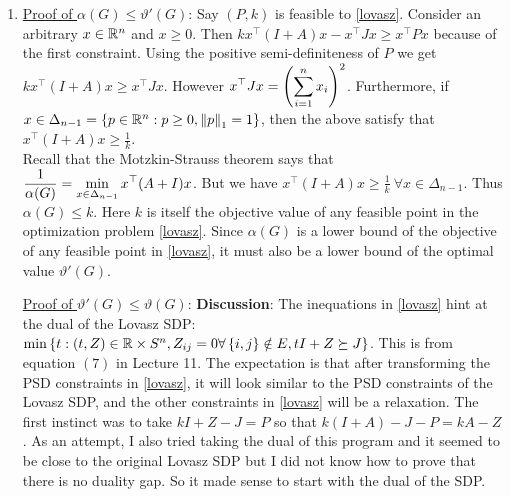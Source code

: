 \soln

\begin{enumerate}[leftmargin=*, label=(\alph*)]
\item \underline{Proof of $\alpha(G)\le \vartheta'(G)$}: Say $(P,k)$ is feasible to \ref{lovasz}. Consider an arbitrary $x\in \mathbb{R}^{n}$ and $x\ge 0$. Then $k x^{\top}(I+A)x - x^{\top}Jx \ge x^{\top} Px$ because of the first constraint. Using the positive semi-definiteness of $P$ we get $k x^{\top}(I+A)x \ge x^{\top}Jx$. However $\displaystyle x^{\top}Jx = \left(\sum_{i=1}^{n}x_{i}\right)^{2}$. Furthermore, if $x\in \Delta_{n-1} = \left\{p\in \mathbb{R}^{n} : p\ge 0, \left\lVert p \right\rVert_{1} = 1\right\}$, then the above satisfy that $x^{\top}(I+A)x \ge \frac{1}{k}$. \\
Recall that the Motzkin-Strauss theorem says that $\displaystyle\frac{1}{\alpha(G)}=\min_{x\in \Delta_{n-1}} x^{\top}(A+I)x$. But we have $x^{\top}(I+A)x \ge \frac{1}{k}~\forall x\in \Delta_{n-1}$. Thus $\alpha(G)\le k$. Here $k$ is itself the objective value of any feasible point in the optimization problem \ref{lovasz}. Since $\alpha(G)$ is a lower bound of the objective of any feasible point in \ref{lovasz}, it must also be a lower bound of the optimal value $\vartheta'(G)$.

\underline{Proof of $\vartheta'(G)\le\vartheta(G)$}:
{\color{gray}\textbf{Discussion}: The inequations in \ref{lovasz} hint at the dual of the Lovasz SDP: $\min\left\{t:(t,Z)\in \mathbb{R}\times S^{n}, Z_{ij}=0\forall \left\{i,j\right\}\notin E, tI+Z\succeq J\right\}$. This is from equation $(7)$ in Lecture 11. The expectation is that after transforming the PSD constraints in \ref{lovasz}, it will look similar to the PSD constraints of the Lovasz SDP, and the other constraints in \ref{lovasz} will be a relaxation. The first instinct was to take $kI+Z-J = P$ so that $k(I+A)-J-P = kA-Z$. As an attempt, I also tried taking the dual of this program and it seemed to be close to the original Lovasz SDP but I did not know how to prove that there is no duality gap. So it made sense to start with the dual of the SDP.}


\end{enumerate}
